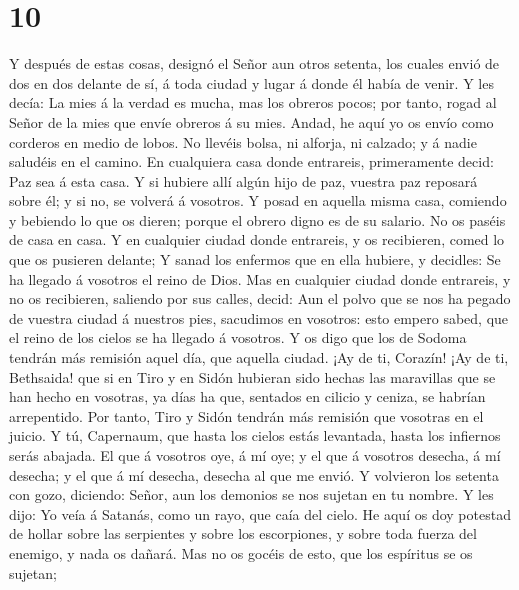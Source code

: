 \hypertarget{section-9}{%
\section{10}\label{section-9}}

 Y después de estas cosas, designó el Señor aun otros
setenta, los cuales envió de dos en dos delante de sí, á toda ciudad y
lugar á donde él había de venir.  Y les decía: La mies á la
verdad es mucha, mas los obreros pocos; por tanto, rogad al Señor de la
mies que envíe obreros á su mies.  Andad, he aquí yo os
envío como corderos en medio de lobos.  No llevéis bolsa, ni
alforja, ni calzado; y á nadie saludéis en el camino.  En
cualquiera casa donde entrareis, primeramente decid: Paz sea á esta
casa.  Y si hubiere allí algún hijo de paz, vuestra paz
reposará sobre él; y si no, se volverá á vosotros.  Y posad
en aquella misma casa, comiendo y bebiendo lo que os dieren; porque el
obrero digno es de su salario. No os paséis de casa en casa.
 Y en cualquier ciudad donde entrareis, y os recibieren,
comed lo que os pusieren delante;  Y sanad los enfermos que
en ella hubiere, y decidles: Se ha llegado á vosotros el reino de Dios.
 Mas en cualquier ciudad donde entrareis, y no os
recibieren, saliendo por sus calles, decid:  Aun el polvo
que se nos ha pegado de vuestra ciudad á nuestros pies, sacudimos en
vosotros: esto empero sabed, que el reino de los cielos se ha llegado á
vosotros.  Y os digo que los de Sodoma tendrán más remisión
aquel día, que aquella ciudad.  ¡Ay de ti, Corazín! ¡Ay de
ti, Bethsaida! que si en Tiro y en Sidón hubieran sido hechas las
maravillas que se han hecho en vosotras, ya días ha que, sentados en
cilicio y ceniza, se habrían arrepentido.  Por tanto, Tiro
y Sidón tendrán más remisión que vosotras en el juicio.  Y
tú, Capernaum, que hasta los cielos estás levantada, hasta los infiernos
serás abajada.  El que á vosotros oye, á mí oye; y el que á
vosotros desecha, á mí desecha; y el que á mí desecha, desecha al que me
envió.  Y volvieron los setenta con gozo, diciendo: Señor,
aun los demonios se nos sujetan en tu nombre.  Y les dijo:
Yo veía á Satanás, como un rayo, que caía del cielo.  He
aquí os doy potestad de hollar sobre las serpientes y sobre los
escorpiones, y sobre toda fuerza del enemigo, y nada os dañará.
 Mas no os gocéis de esto, que los espíritus se os sujetan;
